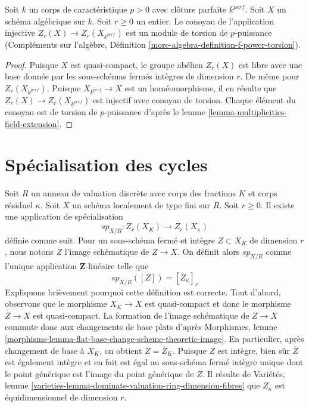 \begin{lemma} 
\label{lemma-how-different} 
Soit  $k$  un corps de caractéristique  $p > 0$  avec clôture parfaite $k^{perf}$. 
Soit  $X$  un schéma algébrique sur  $k$. Soit $r \geq 0$  un entier. Le 
conoyau de l'application injective  $Z_r(X) \to Z_r(X_{k^{perf}})$  est un module de torsion de 
$p$-puissance (Compléments sur l'algèbre, Définition 
\ref{more-algebra-definition-f-power-torsion}). 
\end{lemma} 

\begin{proof} 
Puisque  $X$  est quasi-compact, le groupe abélien  $Z_r(X)$  est libre avec une 
base donnée par les sous-schémas fermés intègres de dimension $r$. De même pour  
$Z_r(X_{k^{perf}})$. 
Puisque  $X_{k^{perf}} \to X$  est un homéomorphisme, il en résulte
 que  $Z_r(X) \to Z_r(X_{k^{perf}})$  est injectif avec conoyau de torsion. Chaque
 élément du conoyau est de torsion de $p$-puissance d'après le
 lemme  \ref{lemma-multiplicities-field-extension}. 
\end{proof} 





\section{Spécialisation des cycles} 
\label{section-specialization} 

\noindent
 Soit  $R$  un anneau de valuation discrète avec corps des fractions $K$
  et corps résiduel  $\kappa$. Soit  $X$  un schéma localement de type fini 
sur  $R$. Soit  $r \geq 0$. Il existe une application de spécialisation 
$$
sp_{X/R} : Z_r(X_K) \longrightarrow Z_r(X_\kappa)
$$
 définie comme suit. Pour un sous-schéma fermé et intègre  $Z \subset X_K$
  de dimension $r$ , nous notons $\overline{Z}$ l'image schématique de
  $Z \to X$. On définit alors $sp_{X/R}$ comme l'unique application $\mathbf{Z}$-linéaire
 telle que 
$$
sp_{X/R}([Z]) = [\overline{Z}_\kappa]_r
$$
 Expliquons brièvement pourquoi cette définition est correcte. Tout d'abord, observons que le
 morphisme  $X_K \to X$  est quasi-compact et donc le morphisme  $Z \to X$
 est quasi-compact. La formation de l'image schématique de $Z \to X$
 commute donc aux changements de base plats 
d'après Morphismes, lemme  \ref{morphisms-lemma-flat-base-change-scheme-theoretic-image}. En 
particulier, après changement de base à $X_K$, on obtient $Z = \overline{Z}_K$. 
Puisque  $Z$  est intègre, bien sûr  $\overline{Z}$  est également intègre
 et en fait est égal au sous-schéma fermé intègre unique dont le point
 générique est l'image du point générique de  $Z$. Il résulte de 
Variétés, lemme  \ref{varieties-lemma-dominate-valuation-ring-dimension-fibres}  
que  $Z_\kappa$  est équidimensionnel de dimension $r$. 

